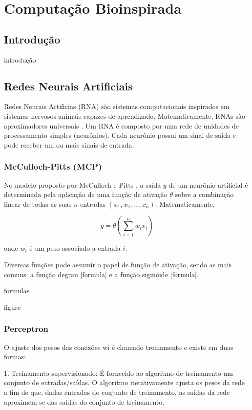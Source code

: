 \chapter{Computação Bioinspirada}
\label{bioinspirada}

\section{Introdução}

introdução

\section{Redes Neurais Artificiais}

Redes Neurais Artificias (RNA) são sistemas computacionais inspirados em sistemas
nervosos animais capazes de aprendizado. Matematicamente, RNAs são aproximadores
universais \cite{hornik89universal}. Um RNA é composto por uma rede de unidades
de processamento simples (neurônios). Cada neurônio possui um sinal de saída e
pode receber um ou mais sinais de entrada.

\subsection{McCulloch-Pitts (MCP)}

No modelo proposto por McCulloch e Pitts \cite{mcculloch43mcp}, a saída \(y\) de um neurônio artificial é determinada pela aplicação de uma função de ativação \(\theta\) sobre a combinação linear de todas as suas \(n\) entradas \((x_1, x_2, ..., x_n)\).
Matematicamente,

\[ y = \theta ( \sum_{i=1}^{n} w_i x_i ) \]

onde \(w_i\) é um peso associado a entrada \(i\).

Diversas funções pode assumir o papel de função de ativação, sendo as mais comuns:
a função degrau [formula] e a função sigmóide [formula].

formulas

figure

\subsection{Perceptron}

O ajuste dos pesos das conexões wi é chamado treinamento e existe em duas formas:

1. Treinamento supervisionado: É fornecido ao algoritmo de treinamento um
conjunto de entradas/saídas. O algoritmo iterativamente ajusta os pesos da rede
a fim de que, dadas entradas do conjunto de treinamento, as saídas da rede
aproximem-se das saídas do conjunto de treinamento.

